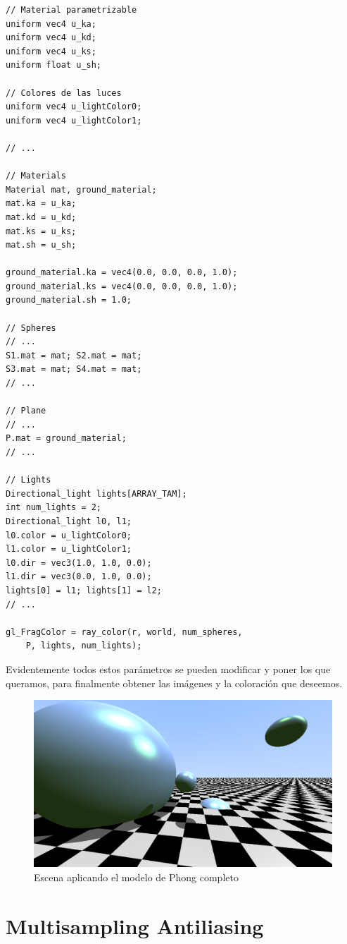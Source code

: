 \begin{lstlisting}
// Material parametrizable
uniform vec4 u_ka;
uniform vec4 u_kd;
uniform vec4 u_ks;
uniform float u_sh;

// Colores de las luces
uniform vec4 u_lightColor0;
uniform vec4 u_lightColor1;

// ... 

// Materials
Material mat, ground_material;
mat.ka = u_ka;
mat.kd = u_kd;
mat.ks = u_ks;
mat.sh = u_sh;

ground_material.ka = vec4(0.0, 0.0, 0.0, 1.0);
ground_material.ks = vec4(0.0, 0.0, 0.0, 1.0);
ground_material.sh = 1.0;

// Spheres
// ... 
S1.mat = mat; S2.mat = mat;
S3.mat = mat; S4.mat = mat;
// ...

// Plane
// ...
P.mat = ground_material;
// ... 

// Lights
Directional_light lights[ARRAY_TAM];
int num_lights = 2;
Directional_light l0, l1;
l0.color = u_lightColor0; 
l1.color = u_lightColor1;
l0.dir = vec3(1.0, 1.0, 0.0);
l1.dir = vec3(0.0, 1.0, 0.0);
lights[0] = l1; lights[1] = l2;
// ... 

gl_FragColor = ray_color(r, world, num_spheres, 
    P, lights, num_lights);
\end{lstlisting}

Evidentemente todos estos parámetros se pueden modificar y poner los que queramos, para finalmente obtener las imágenes y la coloración que deseemos.

\begin{figure} [ht]
    \centering
    \includegraphics[scale = 0.28]{img/C7/phong-final.png}
    \caption{Escena aplicando el modelo de Phong completo}
    \label{fig:phong-final}
\end{figure}

\section{Multisampling Antiliasing}

